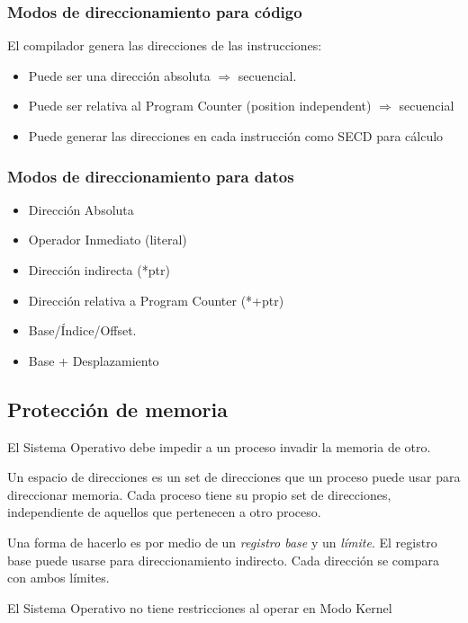 \documentclass[a4paper, twoside]{article}
\begin{document}
\subsubsection{Modos de direccionamiento para código}

El compilador genera las direcciones de las instrucciones:

\begin{itemize}
  \item Puede ser una dirección absoluta $\Rightarrow$ secuencial.
  \item Puede ser relativa al Program Counter (position independent)
  $\Rightarrow$ secuencial
  \item Puede generar las direcciones en cada instrucción como SECD para cálculo
\end{itemize}

\subsubsection{Modos de direccionamiento para datos}

\begin{itemize}
  \item Dirección Absoluta
  \item Operador Inmediato (literal)
  \item Dirección indirecta (*ptr)
  \item Dirección relativa a Program Counter (*+ptr)
  \item Base/Índice/Offset.
  \item Base + Desplazamiento
\end{itemize}

\subsection{Protección de memoria}

El Sistema Operativo debe impedir a un proceso invadir la memoria de otro.

Un espacio de direcciones es un set de direcciones que un proceso puede usar
para direccionar memoria.
Cada proceso tiene su propio set de direcciones, independiente de aquellos que
pertenecen a otro proceso.

Una forma de hacerlo es por medio de un \emph{registro base} y un \emph{límite}.
El registro base puede usarse para direccionamiento indirecto.
Cada dirección se compara con ambos límites.

El Sistema Operativo no tiene restricciones al operar en Modo Kernel
\end{document}
